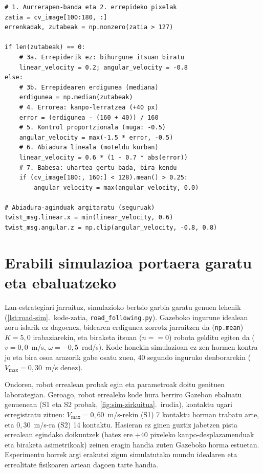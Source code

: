 \begin{lstlisting}[caption={Errepide-jarraipenaren logika nagusia robot errealean (\texttt{road\_following\_final.py}).},label={lst:road}]
# 1. Aurrerapen-banda eta 2. errepideko pixelak
zatia = cv_image[100:180, :]
errenkadak, zutabeak = np.nonzero(zatia > 127)

if len(zutabeak) == 0:
    # 3a. Errepiderik ez: bihurgune itsuan biratu
    linear_velocity = 0.2; angular_velocity = -0.8
else:
    # 3b. Errepidearen erdigunea (mediana)
    erdigunea = np.median(zutabeak)
    # 4. Errorea: kanpo-lerratzea (+40 px)
    error = (erdigunea - (160 + 40)) / 160
    # 5. Kontrol proportzionala (muga: -0.5)
    angular_velocity = max(-1.5 * error, -0.5)
    # 6. Abiadura lineala (moteldu kurban)
    linear_velocity = 0.6 * (1 - 0.7 * abs(error))
    # 7. Babesa: uhartea gertu bada, bira kendu
    if (cv_image[180:, 160:] < 128).mean() > 0.25:
        angular_velocity = max(angular_velocity, 0.0)

# Abiadura-aginduak argitaratu (seguruak)
twist_msg.linear.x = min(linear_velocity, 0.6)
twist_msg.angular.z = np.clip(angular_velocity, -0.8, 0.8)
\end{lstlisting}

\section[Erabili simulazioa portaera garatu eta ebaluatzeko][Simulazioaren bidezko ebaluazioa]{Erabili simulazioa portaera garatu eta ebaluatzeko}\label{sec:er-simulazioa}

Lan-estrategiari jarraituz, simulazioko bertsio garbia garatu genuen lehenik (\ref{lst:road-sim}.~kode-zatia, \texttt{road\_following.py}). Gazeboko ingurune idealean zoru-islarik ez dagoenez, bidearen erdigunea zorrotz jarraitzen da (\texttt{np.mean}) $K = 5{,}0$ irabaziarekin, eta biraketa itsuan ($n == 0$) robota gelditu egiten da ($v = 0{,}0$~m/s, $\omega = -0{,}5$~rad/s). Kode honekin simulazioan ez zen hormen kontra jo eta bira osoa arazorik gabe osatu zuen, 40 segundo inguruko denborarekin ($V_{\max} = 0{,}30$~m/s denez).

Ondoren, robot errealean probak egin eta parametroak doitu genituen laborategian. Geroago, robot errealeko kode hura berriro Gazebon ebaluatu genuenean (S1 eta S2 probak, \ref{fig:sim-zirkuitua}.~irudia), kontaktu ugari erregistratu zituen: $V_{\max} = 0{,}60$~m/s-rekin (S1) 7 kontaktu horman trabatu arte, eta $0{,}30$~m/s-ra (S2) 14 kontaktu. Hasieran ez ginen guztiz jabetzen pista errealean egindako doikuntzek (batez ere $+40$ pixeleko kanpo-desplazamenduak eta biraketa asimetrikoak) zeinen eragin handia zuten Gazeboko horma estuetan. Esperimentu horrek argi erakutsi zigun simulatutako mundu idealaren eta errealitate fisikoaren artean dagoen tarte handia.

